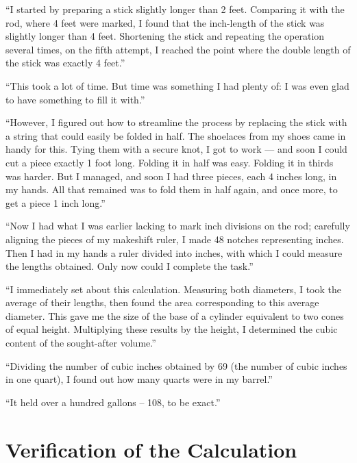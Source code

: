 ``I started by preparing a stick slightly longer than 2 feet. Comparing it with the rod, where 4 feet were marked, I found that the inch-length of the stick was slightly longer than 4 feet. Shortening the stick and repeating the operation several times, on the fifth attempt, I reached the point where the double length of the stick was exactly 4 feet.''

``This took a lot of time. But time was something I had plenty of: I was even glad to have something to fill it with.''

``However, I figured out how to streamline the process by replacing the stick with a string that could easily be folded in half. The shoelaces from my shoes came in handy for this. Tying them with a secure knot, I got to work — and soon I could cut a piece exactly 1 foot long. Folding it in half was easy. Folding it in thirds was harder. But I managed, and soon I had three pieces, each 4 inches long, in my hands. All that remained was to fold them in half again, and once more, to get a piece 1 inch long.''

``Now I had what I was earlier lacking to mark inch divisions on the rod; carefully aligning the pieces of my makeshift ruler, I made 48 notches representing inches. Then I had in my hands a ruler divided into inches, with which I could measure the lengths obtained. Only now could I complete the task.''

``I immediately set about this calculation. Measuring both diameters, I took the average of their lengths, then found the area corresponding to this average diameter. This gave me the size of the base of a cylinder equivalent to two cones of equal height. Multiplying these results by the height, I determined the cubic content of the sought-after volume.''

``Dividing the number of cubic inches obtained by 69 (the number of cubic inches in one quart), I found out how many quarts were in my barrel.''

``It held over a hundred gallons -- 108, to be exact.''


\section{Verification of the Calculation}
\label{sec-8.5}



